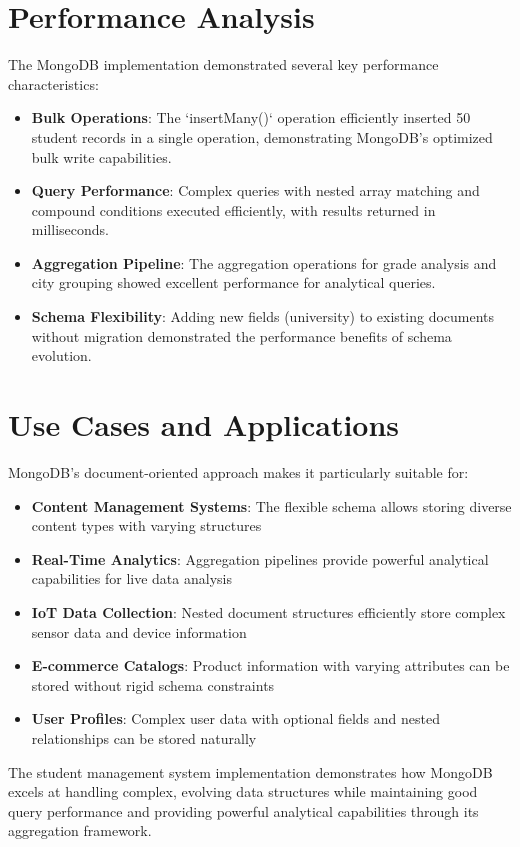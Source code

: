 \section{Performance Analysis}

The MongoDB implementation demonstrated several key performance characteristics:

\begin{itemize}
    \item \textbf{Bulk Operations}: The `insertMany()` operation efficiently inserted 50 student records in a single operation, demonstrating MongoDB's optimized bulk write capabilities.
    \item \textbf{Query Performance}: Complex queries with nested array matching and compound conditions executed efficiently, with results returned in milliseconds.
    \item \textbf{Aggregation Pipeline}: The aggregation operations for grade analysis and city grouping showed excellent performance for analytical queries.
    \item \textbf{Schema Flexibility}: Adding new fields (university) to existing documents without migration demonstrated the performance benefits of schema evolution.
\end{itemize}

\section{Use Cases and Applications}

MongoDB's document-oriented approach makes it particularly suitable for:

\begin{itemize}
    \item \textbf{Content Management Systems}: The flexible schema allows storing diverse content types with varying structures
    \item \textbf{Real-Time Analytics}: Aggregation pipelines provide powerful analytical capabilities for live data analysis
    \item \textbf{IoT Data Collection}: Nested document structures efficiently store complex sensor data and device information
    \item \textbf{E-commerce Catalogs}: Product information with varying attributes can be stored without rigid schema constraints
    \item \textbf{User Profiles}: Complex user data with optional fields and nested relationships can be stored naturally
\end{itemize}

The student management system implementation demonstrates how MongoDB excels at handling complex, evolving data structures while maintaining good query performance and providing powerful analytical capabilities through its aggregation framework.